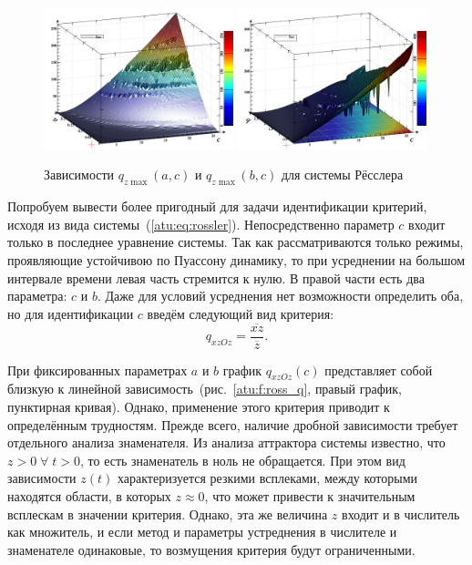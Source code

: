 \begin{figure}[ht!]
\begin{center}
  \includegraphics[width=0.49\textwidth]{p/cha/ross/ross_zmax_a_c.png}
  \hfill
  \includegraphics[width=0.49\textwidth]{p/cha/ross/ross_zmax_b_c.png}
\end{center}
  \caption{Зависимости $q_{z \max{}}(a,c)$ и  $q_{z \max{}}(b,c) $ для системы Рёсслера}
\label{atu:f:ross_q_zmax_ac_bc}
\end{figure}

Попробуем вывести более пригодный для задачи идентификации критерий,
исходя из вида системы~(\ref{atu:eq:rossler}).
Непосредственно параметр $c$ входит только в последнее уравнение системы.
Так как рассматриваются только режимы, проявляющие устойчивою по Пуассону динамику,
то при усреднении на большом интервале времени левая часть стремится к нулю.
В правой части есть два параметра: $c$ и $b$.
Даже для условий усреднения нет возможности определить оба,
но для идентификации $c$ введём следующий вид критерия:
%
\begin{equation}
  q_{xzOz} =
  \frac{ \overline{xz}}{ \overline{z}}.
  \label{atu:eq:ross_qzxOz}
\end{equation}

При фиксированных параметрах $a$ и $b$ график $q_{xzOz}(c)$
представляет собой близкую к линейной
зависимость~(рис.~\ref{atu:f:ross_q}, правый график, пунктирная кривая).
Однако, применение этого критерия приводит к определённым трудностям.
Прежде всего, наличие дробной зависимости требует отдельного анализа
знаменателя. Из анализа аттрактора системы известно, что $z>0 \; \forall \; t > 0$,
то есть знаменатель в ноль не обращается. При этом вид
зависимости $z(t)$ характеризуется резкими всплеками,
между которыми находятся области, в которых $z \approx 0 $,
что может привести к значительным всплескам в значении критерия.
Однако, эта же величина $z$ входит и в числитель как множитель,
и если метод и параметры устреднения в числителе и знаменателе
одинаковые, то возмущения критерия будут ограниченными.


